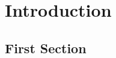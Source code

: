 \chapter{Introduction}
\label{cha:introduction}

\section{First Section}
\label{sec:first_section}

\lipsum
